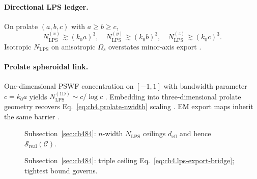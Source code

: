 \paragraph{Directional LPS ledger.}
On prolate \((a,b,c)\) with \(a\ge b\ge c\),
\begin{equation}
\label{eq:ch4.lps-directional-ledger}
N_{\mathrm{LPS}}^{(x)}\gtrsim(k_{0}a)^{3},\quad
N_{\mathrm{LPS}}^{(y)}\gtrsim(k_{0}b)^{3},\quad
N_{\mathrm{LPS}}^{(z)}\gtrsim(k_{0}c)^{3}.
\end{equation}
Isotropic \(N_{\mathrm{LPS}}\) on anisotropic \(\Omega_{s}\) overstates minor-axis export \cite{harrington2001,stratton1941,hansen1988}.

\paragraph{Prolate spheroidal link.}
One-dimensional PSWF concentration on \([-1,1]\) with bandwidth parameter \(c=k_{0}a\) yields \(N_{\mathrm{LPS}}^{(1\mathrm{D})}\sim c/\log c\)
\cite{hansen1988,jackson1999}. Embedding into three-dimensional prolate geometry recovers Eq.~\eqref{eq:ch4.prolate-nwidth} scaling
\cite{stratton1941,harrington2001,devaney2004}. EM export maps inherit the same barrier \cite{hansen1988}.

\begin{figure}[t]
\centering
{}
\caption{Subsection~\ref{sec:ch484}: \(n\)-width \(N_{\mathrm{LPS}}\) ceilings \(d_{\mathrm{eff}}\) and hence \(\mathcal{S}_{\mathrm{real}}(\mathcal{C})\).}
\label{fig:ch4.lps-nwidth}
\end{figure}

\begin{figure}[t]
\centering
{}
\caption{Subsection~\ref{sec:ch484}: triple ceiling Eq.~\eqref{eq:ch4.lps-export-bridge}; tightest bound governs.}
\label{fig:ch4.triple-ceiling}
\end{figure}

